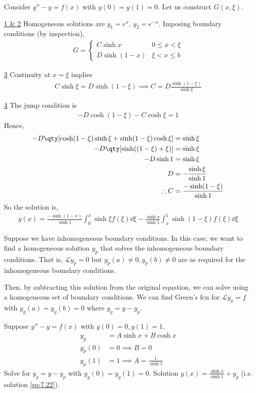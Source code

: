 \begin{example}
	Consider $y'' - y = f(x)$ with $y(0) = y(1) = 0$.
	Let us construct $G(x, \xi)$.

	\underline{1 \& 2}
	Homogeneous solutions are $y_1 = e^x$, $y_2 = e^{-x}$.
	Imposing boundary conditions (by inspection),
	\begin{align*}
		G = \begin{cases}
			C \sinh x    & 0 \leq x < \xi \\
			D \sinh(1-x) & \xi < x \leq b
		\end{cases}
	\end{align*}

	\underline{3}
	Continuity at $x = \xi$ implies
	\begin{align*}
		C \sinh \xi = D \sinh (1 - \xi) \implies C = D \frac{\sinh (1-\xi)}{\sinh \xi}
	\end{align*}

	\underline{4}
	The jump condition is
	\begin{align*}
		-D \cosh(1-\xi) - C \cosh \xi = 1
	\end{align*}
	Hence,
	\begin{align*}
		-D\qty[\cosh(1-\xi)\sinh \xi + \sinh(1-\xi)\cosh \xi] & = \sinh \xi  \\
		-D\qty[\sinh((1-\xi) + \xi)] &= \sinh \xi \\
		-D\sinh 1 &= \sinh \xi \\
		D &= -\frac{\sinh \xi}{\sinh 1} \\
		\therefore C &= \frac{-\sinh(1-\xi)}{\sinh 1}
	\end{align*}
	So the solution is,
	\begin{align} \label{eq:7.22}
		y(x) = \frac{-\sinh(1-x)}{\sinh 1} \int_0^x \sinh \xi f(\xi) \dd{\xi} - \frac{\sinh x}{\sinh 1} \int_x^1 \sinh (1-\xi) f(\xi) \dd{\xi}
	\end{align}
\end{example}
Suppose we have inhomogeneous boundary conditions.
In this case, we want to find a homogeneous solution $y_p$ that solves the inhomogeneous boundary conditions.
That is, $\mathcal L y_p = 0$ but $y_p(a) \neq 0, y_p(b) \neq 0$ are as required for the inhomogeneous boundary conditions.

Then, by subtracting this solution from the original equation, we can solve using a homogeneous set of boundary conditions.
We can find Green's fcn for $\mathcal{L} y_g = f$ with $y_g(a) = y_g(b) = 0$ where $y_g = y - y_p$.

\begin{example}
	Suppose $y'' - y = f(x)$ with $y(0) = 0, y(1) = 1$. \\
	\begin{align*}
		y_p &= A \sinh x + B \cosh x \\
		y_p(0) &= 0 \implies B = 0 \\
		y_p(1) &= 1 \implies A = \frac{1}{\sinh 1}
	\end{align*} 
	Solve for $y_g = y - y_p$ with $y_g(0) = y_g(1) = 0$.
	Solution $y(x) = \frac{\sinh x}{\sinh 1} + y_g$ (i.e. solution \cref{eq:7.22}).
\end{example}

